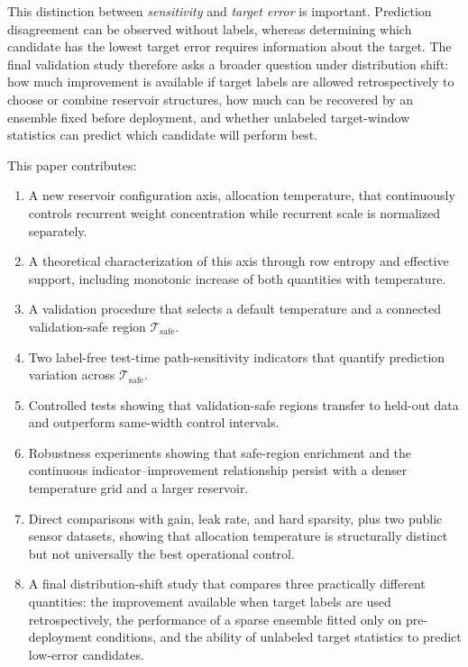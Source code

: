 \documentclass[11pt,a4paper]{article}
\begin{document}
This distinction between \emph{sensitivity} and \emph{target error} is important. Prediction disagreement can be observed without labels, whereas determining which candidate has the lowest target error requires information about the target. The final validation study therefore asks a broader question under distribution shift: how much improvement is available if target labels are allowed retrospectively to choose or combine reservoir structures, how much can be recovered by an ensemble fixed before deployment, and whether unlabeled target-window statistics can predict which candidate will perform best.

This paper contributes:
\begin{enumerate}[leftmargin=*]
  \item A new reservoir configuration axis, allocation temperature, that continuously controls recurrent weight concentration while recurrent scale is normalized separately.
  \item A theoretical characterization of this axis through row entropy and effective support, including monotonic increase of both quantities with temperature.
  \item A validation procedure that selects a default temperature and a connected validation-safe region $\mathcal{T}_{\mathrm{safe}}$.
  \item Two label-free test-time path-sensitivity indicators that quantify prediction variation across $\mathcal{T}_{\mathrm{safe}}$.
  \item Controlled tests showing that validation-safe regions transfer to held-out data and outperform same-width control intervals.
  \item Robustness experiments showing that safe-region enrichment and the continuous indicator--improvement relationship persist with a denser temperature grid and a larger reservoir.
  \item Direct comparisons with gain, leak rate, and hard sparsity, plus two public sensor datasets, showing that allocation temperature is structurally distinct but not universally the best operational control.
  \item A final distribution-shift study that compares three practically different quantities: the improvement available when target labels are used retrospectively, the performance of a sparse ensemble fitted only on pre-deployment conditions, and the ability of unlabeled target statistics to predict low-error candidates.
\end{enumerate}
\end{document}

